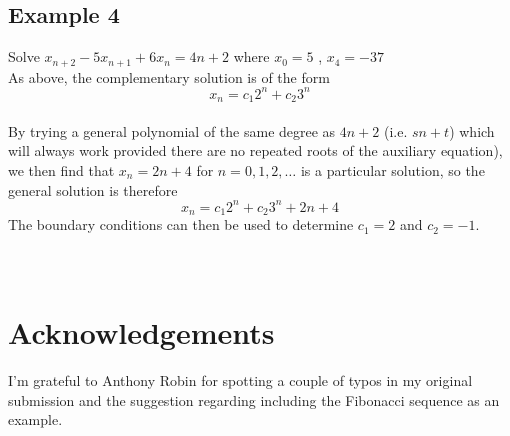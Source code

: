 \documentclass[a4paper,10pt]{article}
\begin{document}
\begin{flushleft}
\subsection{Example 4}
Solve $x_{n+2} - 5x_{n+1} + 6x_n = 4n+2$ where $x_0=5$ , $x_4=-37$ \\
As above, the complementary solution is of the form 
\begin{equation} 
x_n = c_1 2^n + c_2 3^n
\end{equation}
\\
By trying a general polynomial of the same degree as $4n+2$ (i.e. $sn+t$) which will always work provided there are no repeated roots of the auxiliary equation), we then find that $x_n = 2n+4 $ for $n=0, 1, 2, \ldots$ is a particular solution, so the general solution is therefore   
\begin{equation} 
x_n = c_1 2^n + c_2 3^n + 2n + 4
\end{equation}
The boundary conditions can then be used to determine $c_1 = 2$ and $c_2 = -1$.
\\  
\qquad \\ 
\qquad \\ 
\section{Acknowledgements}
I'm grateful to Anthony Robin for spotting a couple of typos in my original submission and the suggestion regarding including the Fibonacci sequence as an example.
\end{flushleft}
\end{document}
